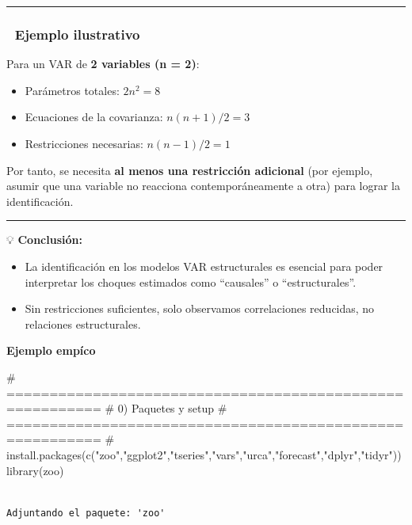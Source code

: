 \documentclass[
  spanish,
  letterpaper,
  DIV=11,
  numbers=noendperiod]{scrartcl}
\newenvironment{Shaded}{\begin{snugshade}}{\end{snugshade}}
\newcommand{\CommentTok}[1]{\textcolor[rgb]{0.37,0.37,0.37}{#1}}
\newcommand{\FunctionTok}[1]{\textcolor[rgb]{0.28,0.35,0.67}{#1}}
\newcommand{\NormalTok}[1]{\textcolor[rgb]{0.00,0.23,0.31}{#1}}
\providecommand{\tightlist}{%
  \setlength{\itemsep}{0pt}\setlength{\parskip}{0pt}}
\begin{document}
\begin{center}\rule{0.5\linewidth}{0.5pt}\end{center}

\subsubsection{🧠 Ejemplo ilustrativo}\label{ejemplo-ilustrativo}

Para un VAR de \textbf{2 variables (n = 2)}:

\begin{itemize}
\tightlist
\item
  Parámetros totales: \(2n^2 = 8\)
\item
  Ecuaciones de la covarianza: \(n(n + 1)/2 = 3\)
\item
  Restricciones necesarias: \(n(n - 1)/2 = 1\)
\end{itemize}

Por tanto, se necesita \textbf{al menos una restricción adicional} (por
ejemplo, asumir que una variable no reacciona contemporáneamente a otra)
para lograr la identificación.

\begin{center}\rule{0.5\linewidth}{0.5pt}\end{center}

💡 \textbf{Conclusión:}

\begin{itemize}
\item
  La identificación en los modelos VAR estructurales es esencial para
  poder interpretar los choques estimados como ``causales'' o
  ``estructurales''.
\item
  Sin restricciones suficientes, solo observamos correlaciones
  reducidas, no relaciones estructurales.
\end{itemize}

\textbf{Ejemplo empíco}

\begin{Shaded}
\begin{Highlighting}[]
\CommentTok{\# =========================================================}
\CommentTok{\# 0) Paquetes y setup}
\CommentTok{\# =========================================================}
\CommentTok{\# install.packages(c("zoo","ggplot2","tseries","vars","urca","forecast","dplyr","tidyr"))}
\FunctionTok{library}\NormalTok{(zoo)}
\end{Highlighting}
\end{Shaded}

\begin{verbatim}

Adjuntando el paquete: 'zoo'
\end{verbatim}
\end{document}
